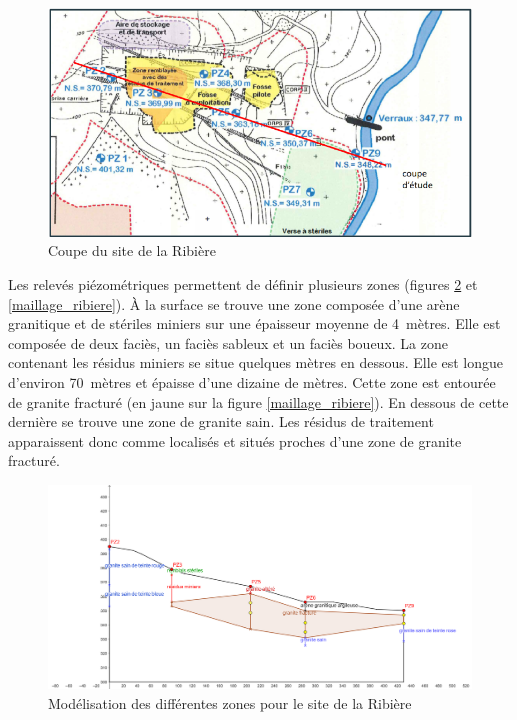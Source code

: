 \documentclass{article}
\begin{document}
\begin{figure}[H]
    \centering
    \includegraphics[width =\textwidth]{III_B_3_2.png} 
    \caption{Coupe du site de la Ribière}
    \label{fig:coupe_site_ribiere}
\end{figure}

Les relevés piézométriques permettent de définir plusieurs zones (figures \ref{fig:zones_ribieres_geogebra} et \ref{maillage_ribiere}). À la surface se trouve une zone composée d’une arène granitique et de stériles miniers sur une épaisseur moyenne de 4~mètres. Elle est composée de deux faciès, un faciès sableux et un faciès boueux. La zone contenant les résidus miniers se situe quelques mètres en dessous. Elle est longue d'environ 70~mètres et épaisse d'une dizaine de mètres. Cette zone est entourée de granite fracturé (en jaune sur la figure \ref{maillage_ribiere}). En dessous de cette dernière se trouve une zone de granite sain. Les résidus de traitement apparaissent donc comme localisés et situés proches d’une zone de granite fracturé.

\begin{figure}[H]
    \centering
    \includegraphics[width=0.8\linewidth]{III_B_3_3.png}
    \caption{Modélisation  des différentes zones pour le site de la Ribière}
    \label{fig:zones_ribieres_geogebra}
\end{figure}
\end{document}
